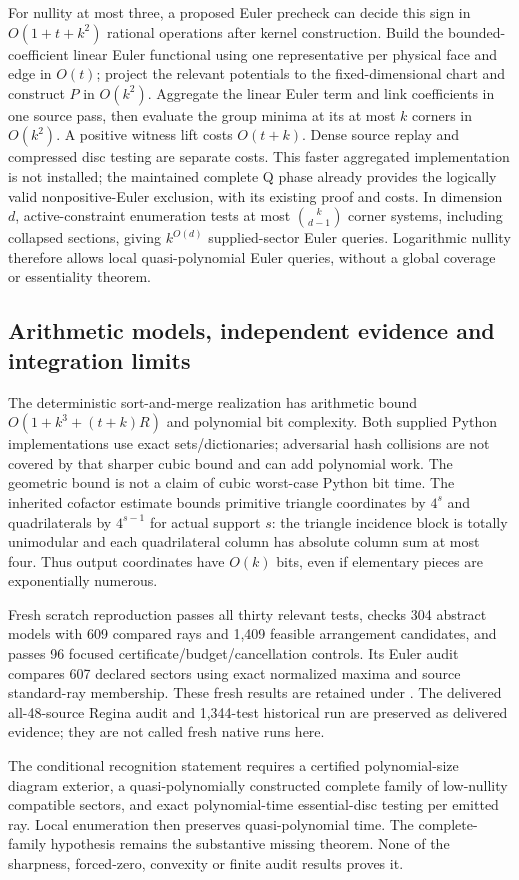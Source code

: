 For nullity at most three, a proposed Euler precheck can decide this sign
in $O(1+t+k^2)$ rational operations after kernel construction. Build the
bounded-coefficient linear Euler functional using one representative per
physical face and edge in $O(t)$; project the relevant potentials to the
fixed-dimensional chart and construct $P$ in $O(k^2)$. Aggregate the
linear Euler term and link coefficients in one source pass, then evaluate
the group minima at its at most $k$ corners in $O(k^2)$. A positive witness
lift costs $O(t+k)$. Dense source replay and compressed disc testing are
separate costs. This faster aggregated implementation is not installed;
the maintained complete Q phase already provides the logically valid
nonpositive-Euler exclusion, with its existing proof and costs.
In dimension $d$, active-constraint enumeration tests at most
$\binom{k}{d-1}$ corner systems, including collapsed sections, giving
$k^{O(d)}$ supplied-sector Euler queries. Logarithmic nullity therefore
allows local quasi-polynomial Euler queries, without a global coverage
or essentiality theorem.

\subsection{Arithmetic models, independent evidence and integration limits}

The deterministic sort-and-merge realization has arithmetic bound
$O(1+k^3+(t+k)R)$ and polynomial bit complexity. Both supplied Python
implementations use exact sets/dictionaries; adversarial hash collisions
are not covered by that sharper cubic bound and can add polynomial work.
The geometric bound is not a claim of cubic worst-case Python bit time.
The inherited cofactor estimate bounds primitive triangle coordinates
by $4^s$ and quadrilaterals by $4^{s-1}$ for actual support $s$: the
triangle incidence block is totally unimodular and each quadrilateral
column has absolute column sum at most four. Thus output coordinates
have $O(k)$ bits, even if elementary pieces are exponentially numerous.

Fresh scratch reproduction passes all thirty relevant tests, checks 304
abstract models with 609 compared rays and 1,409 feasible arrangement
candidates, and passes 96 focused certificate/budget/cancellation controls.
Its Euler audit compares 607 declared sectors using exact normalized
maxima and source standard-ray membership. These fresh results are retained
under . The delivered all-48-source Regina
audit and 1,344-test historical run are preserved as delivered evidence;
they are not called fresh native runs here.

The conditional recognition statement requires a certified polynomial-size
diagram exterior, a quasi-polynomially constructed complete family of
low-nullity compatible sectors, and exact polynomial-time essential-disc
testing per emitted ray. Local enumeration then preserves quasi-polynomial
time. The complete-family hypothesis remains the substantive missing
theorem. None of the sharpness, forced-zero, convexity or finite audit
results proves it.
